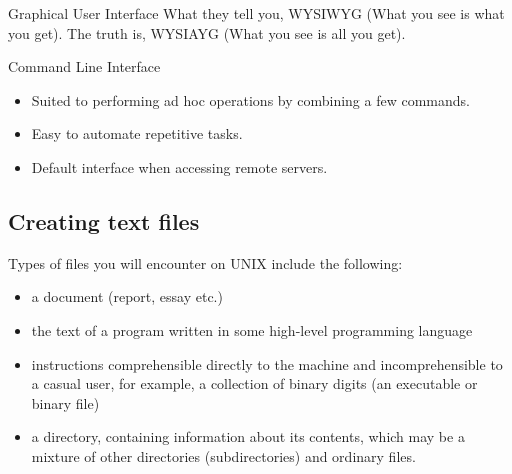 


\begin{frame}
\begin{block}{Graphical User Interface}
What they tell you, WYSIWYG (What you see is what you get). \pause
The truth is, WYSIAYG (What you see is all you get).
\end{block}

\pause

\begin{block}{Command Line Interface}
\begin{itemize}
\item Suited to performing ad hoc operations by combining a few commands.  
\item Easy to automate repetitive tasks.
\item Default interface when accessing remote servers.  
\end{itemize}
\end{block}
\end{frame}


\subsection{Creating text files}
Types of files you will encounter on UNIX include the following:
\begin{itemize}
\item a document (report, essay etc.)
\item the text of a program written in some high-level programming language
\item instructions comprehensible directly to the machine and incomprehensible 
to a casual user, for example, a collection of binary digits (an executable or 
binary file)
\item a directory, containing information about its contents, which may be a 
mixture of other directories (subdirectories) and ordinary files.
\end{itemize}

